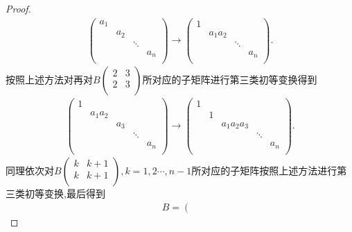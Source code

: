 \documentclass[lang=cn,newtx,10pt,scheme=chinese]{elegantbook}
\begin{document}
\begin{proof}
\begin{align*}
    \left( \begin{matrix}
        a_1&		&		&		\\
        &		a_2&		&		\\
        &		&		\ddots&		\\
        &		&		&		a_n\\
    \end{matrix} \right) \longrightarrow \left( \begin{matrix}
        1&		&		&		\\
        &		a_1a_2&		&		\\
        &		&		\ddots&		\\
        &		&		&		a_n\\
    \end{matrix} \right) .
\end{align*}
按照上述方法对再对$B\left( \begin{matrix}
	2&		3\\
	2&		3\\
\end{matrix} \right) $所对应的子矩阵进行第三类初等变换得到
\begin{align*}
    \left( \begin{matrix}
        1&		&		&		&		\\
        &		a_1a_2&		&		&		\\
        &		&		a_3&		&		\\
        &		&		&		\ddots&		\\
        &		&		&		&		a_n\\
    \end{matrix} \right) \longrightarrow \left( \begin{matrix}
        1&		&		&		&		\\
        &		1&		&		&		\\
        &		&		a_1a_2a_3&		&		\\
        &		&		&		\ddots&		\\
        &		&		&		&		a_n\\
    \end{matrix} \right) .
\end{align*}
同理依次对$B\left( \begin{matrix}
	k&		k+1\\
	k&		k+1\\
\end{matrix} \right),k=1,2\cdots,n-1$所对应的子矩阵按照上述方法进行第三类初等变换,最后得到
\begin{align*}
    B=\left( \begin{matrix}

\end{matrix}
\end{align*}
\end{proof}
\end{document}
